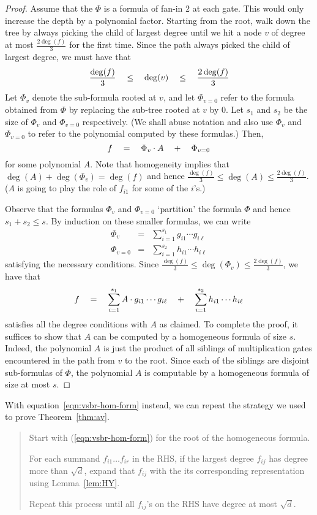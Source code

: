 \documentclass[12pt]{report}
\begin{document}
\begin{proof}
Assume that the $\Phi$ is a formula of fan-in $2$ at each gate. This would only increase the depth by a polynomial factor. Starting from the root, walk down the tree by always picking the child of largest degree until we hit a node $v$ of degree at most $\frac{2\deg(f)}{3}$ for the first time. Since the path always picked the child of largest degree, we must have that 
\[
\frac{\deg(f)}{3}\quad \leq \quad\deg(v)\quad \leq \quad \frac{2\deg(f)}{3}
\]
Let $\Phi_v$ denote the sub-formula rooted at $v$, and let $\Phi_{v=0}$ refer to the formula obtained from $\Phi$ by replacing the sub-tree rooted at $v$ by $0$. Let $s_1$ and $s_2$ be the size of $\Phi_v$ and $\Phi_{v=0}$ respectively. (We shall abuse notation and also use $\Phi_v$ and $\Phi_{v=0}$ to refer to the polynomial computed by these formulas.) Then,
\[
f \quad = \quad \Phi_v \cdot A \quad + \quad \Phi_{v=0}
\] 
for some polynomial $A$. Note that homogeneity implies that $\deg(A) + \deg(\Phi_v) = \deg(f)$ and hence $\frac{\deg(f)}{3} \leq \deg(A) \leq \frac{2\deg(f)}{3}$. ($A$ is going to play the role of $f_{i1}$ for some of the $i$'s.)

Observe that the formulas $\Phi_v$ and $\Phi_{v=0}$ `partition' the formula $\Phi$ and hence $s_1 + s_2 \leq s$. By induction on these smaller formulas, we can write
\begin{eqnarray*}
\Phi_v & = & \sum_{i=1}^{s_1} g_{i1} \cdots g_{i\ell}\\
\Phi_{v=0} & = & \sum_{i=1}^{s_2} h_{i1} \cdots h_{i\ell}
\end{eqnarray*}
satisfying the necessary conditions. Since $\frac{\deg(f)}{3} \leq \deg(\Phi_v)\leq \frac{2\deg(f)}{3}$, we have that
\[
f \quad = \quad \sum_{i=1}^{s_1} A \cdot g_{i1} \cdots g_{i\ell} \quad + \quad \sum_{i=1}^{s_2} h_{i1} \cdots h_{i\ell}
\]
satisfies all the degree conditions with $A$ as claimed. To complete the proof, it suffices to show that $A$ can be computed by a homogeneous formula of size $s$. Indeed, the polynomial $A$ is just the product of all siblings of multiplication gates encountered in the path from $v$ to the root. Since each of the siblings are disjoint sub-formulas of $\Phi$, the polynomial $A$ is computable by a homogeneous formula of size at most $s$. 
\end{proof}

With equation~\eqref{eqn:vsbr-hom-form} instead, we can repeat the strategy we used to prove Theorem~\ref{thm:av}. 
\begin{mdframed}
\begin{quote}
Start with (\ref{eqn:vsbr-hom-form}) for the root of the homogeneous formula. 

For each summand $f_{i1}\dots f_{ir}$ in the RHS, if the largest degree $f_{ij}$ has degree more than $\sqrt{d}$, expand that $f_{ij}$ with the its corresponding representation using Lemma~\ref{lem:HY}. 

Repeat this process until all $f_{ij}$'s on the RHS have degree at most $\sqrt{d}$. 
\end{quote}
\end{mdframed}
\end{document}
